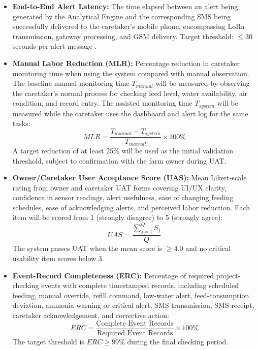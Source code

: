 \begin{itemize}
  \item \textbf{End-to-End Alert Latency:} The time elapsed between an alert being generated by the Analytical Engine and the corresponding SMS being successfully delivered to the caretaker's mobile phone, encompassing LoRa transmission, gateway processing, and GSM delivery. Target threshold: $\le 30$ seconds per alert message \cite{beyondtech2025smart,reza2025review}.
  \item \textbf{Manual Labor Reduction (MLR):} Percentage reduction in caretaker monitoring time when using the system compared with manual observation. The baseline manual-monitoring time $T_{manual}$ will be measured by observing the caretaker's normal process for checking feed level, water availability, air condition, and record entry. The assisted monitoring time $T_{system}$ will be measured while the caretaker uses the dashboard and alert log for the same tasks:
    \begin{equation}
      MLR = \frac{T_{manual} - T_{system}}{T_{manual}} \times 100\%
    \end{equation}
    A target reduction of at least 25\% will be used as the initial validation threshold, subject to confirmation with the farm owner during UAT.
  \item \textbf{Owner/Caretaker User Acceptance Score (UAS):} Mean Likert-scale rating from owner and caretaker UAT forms covering UI/UX clarity, confidence in sensor readings, alert usefulness, ease of changing feeding schedules, ease of acknowledging alerts, and perceived labor reduction. Each item will be scored from 1 (strongly disagree) to 5 (strongly agree):
    \begin{equation}
      UAS = \frac{\sum_{j=1}^{Q} S_j}{Q}
    \end{equation}
    The system passes UAT when the mean score is $\geq 4.0$ and no critical usability item scores below 3.
  \item \textbf{Event-Record Completeness (ERC):} Percentage of required project-checking events with complete timestamped records, including scheduled feeding, manual override, refill command, low-water alert, feed-consumption deviation, ammonia warning or critical alert, SMS transmission, SMS receipt, caretaker acknowledgement, and corrective action:
    \begin{equation}
      ERC = \frac{\text{Complete Event Records}}{\text{Required Event Records}} \times 100\%
    \end{equation}
    The target threshold is $ERC \geq 99\%$ during the final checking period.
\end{itemize}

